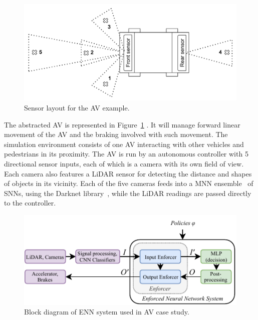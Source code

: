 \begin{figure}[h]
	\centering
	\includegraphics[scale=0.24,trim={0 7mm 0 7mm},clip ]{Content/fig/AV.pdf}
	\caption{Sensor layout for the \ac{AV} example. \label{fig:av}}
\end{figure}
\vspace{1em}
The abstracted \acf{AV} is represented in Figure~\ref{fig:av} .
It will manage forward linear movement of the \ac{AV} and the braking involved with such movement.
The simulation environment consists of one \ac{AV} interacting with other vehicles and pedestrians in its proximity.
The \ac{AV} is run by an autonomous controller with 5 directional sensor inputs, each of which is a camera with its own field of view.
Each camera also features a \acf{LiDAR} sensor for detecting the
distance and shapes of objects in its vicinity.
Each of the five cameras feeds into a \acf{MNN} ensemble~\cite{Maqsood2004} of \acp{SNN}, using the Darknet library~\cite{darknet13}, while the \ac{LiDAR} readings are passed directly to the controller.
\begin{figure}[b]
	\centering
	\includegraphics[scale=1.0]{Content/fig/model-driven-ai-av-example.pdf}
	\caption{Block diagram of \ac{ENN} system used in \ac{AV} case study. \label{fig:avnenf}}
	\vspace{-4mm}
\end{figure}

